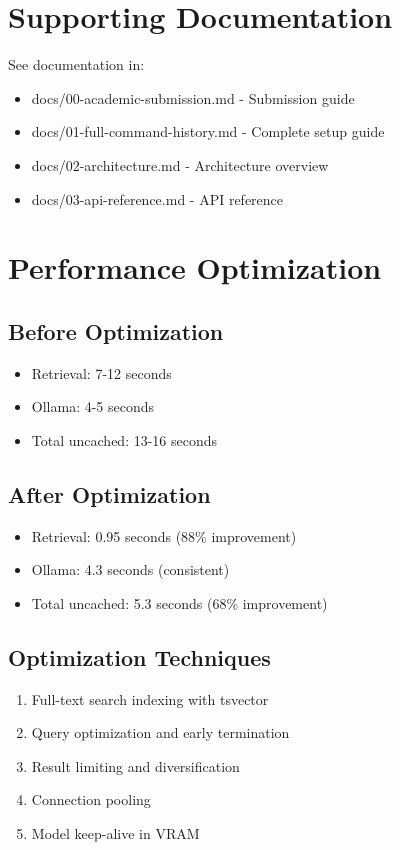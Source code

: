 \documentclass[12pt]{article}
\begin{document}
\section{Supporting Documentation}

See documentation in:
\begin{itemize}
    \item docs/00-academic-submission.md - Submission guide
    \item docs/01-full-command-history.md - Complete setup guide
    \item docs/02-architecture.md - Architecture overview
    \item docs/03-api-reference.md - API reference
\end{itemize}

\section{Performance Optimization}

\subsection{Before Optimization}

\begin{itemize}
    \item Retrieval: 7-12 seconds
    \item Ollama: 4-5 seconds
    \item Total uncached: 13-16 seconds
\end{itemize}

\subsection{After Optimization}

\begin{itemize}
    \item Retrieval: 0.95 seconds (88\% improvement)
    \item Ollama: 4.3 seconds (consistent)
    \item Total uncached: 5.3 seconds (68\% improvement)
\end{itemize}

\subsection{Optimization Techniques}

\begin{enumerate}
    \item Full-text search indexing with tsvector
    \item Query optimization and early termination
    \item Result limiting and diversification
    \item Connection pooling
    \item Model keep-alive in VRAM
\end{enumerate}
\end{document}
